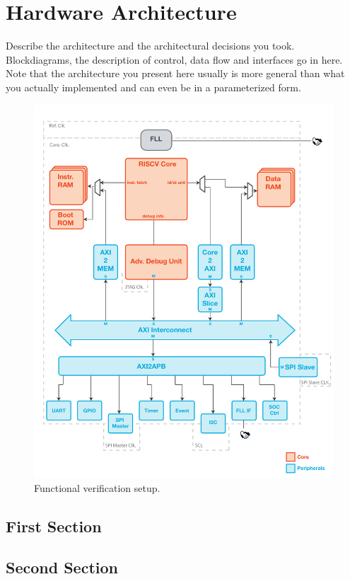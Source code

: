 
\chapter{Hardware Architecture}
Describe the architecture and the architectural decisions you
took. Blockdiagrams, the description of control, data flow and
interfaces go in here. Note that the architecture you present here
usually is more general than what you actually implemented and can
even be in a parameterized form.

\begin{figure}[tb]
  \centering
  \includegraphics[width=\linewidth]{./figures/pulpino_blockdiagram}
  \caption{Functional verification setup.}
  \label{fig:block_diagram}
\end{figure}


\section{First Section}


\section{Second Section}

